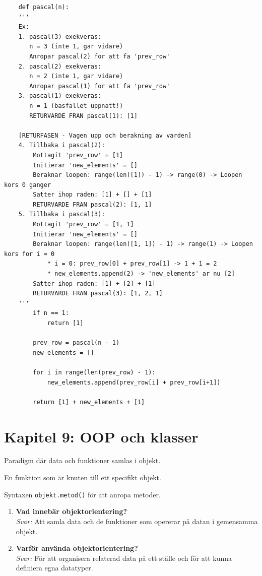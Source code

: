 \documentclass[11pt,a4paper]{article}
\begin{document}
\begin{lstlisting}
    def pascal(n):
    '''
    Ex:
    1. pascal(3) exekveras:
       n = 3 (inte 1, gar vidare)
       Anropar pascal(2) for att fa 'prev_row'
    2. pascal(2) exekveras:
       n = 2 (inte 1, gar vidare)
       Anropar pascal(1) for att fa 'prev_row'
    3. pascal(1) exekveras:
       n = 1 (basfallet uppnatt!)
       RETURVARDE FRAN pascal(1): [1]

    [RETURFASEN - Vagen upp och berakning av varden]
    4. Tillbaka i pascal(2):
        Mottagit 'prev_row' = [1]
        Initierar 'new_elements' = []
        Beraknar loopen: range(len([1]) - 1) -> range(0) -> Loopen kors 0 ganger
        Satter ihop raden: [1] + [] + [1]
        RETURVARDE FRAN pascal(2): [1, 1]
    5. Tillbaka i pascal(3):
        Mottagit 'prev_row' = [1, 1]
        Initierar 'new_elements' = []
        Beraknar loopen: range(len([1, 1]) - 1) -> range(1) -> Loopen kors for i = 0
            * i = 0: prev_row[0] + prev_row[1] -> 1 + 1 = 2
            * new_elements.append(2) -> 'new_elements' ar nu [2]
        Satter ihop raden: [1] + [2] + [1]
        RETURVARDE FRAN pascal(3): [1, 2, 1]
    '''
        if n == 1:
            return [1]
        
        prev_row = pascal(n - 1)
        new_elements = []
        
        for i in range(len(prev_row) - 1):
            new_elements.append(prev_row[i] + prev_row[i+1])
            
        return [1] + new_elements + [1]
\end{lstlisting}

\section{Kapitel 9: OOP och klasser}

\begin{description}[style=nextline, leftmargin=1cm, labelindent=0.5cm]
    \item[\color{primary}Objektorientering] Paradigm där data och funktioner samlas i objekt.
    \item[\color{primary}Metod] En funktion som är knuten till ett specifikt objekt.
    \item[\color{primary}Punktnotation] Syntaxen \texttt{objekt.metod()} för att anropa metoder.
\end{description}

\begin{enumerate}[label=\bfseries\color{primary}Fråga \arabic*:, leftmargin=1.8cm]
    \item \textbf{Vad innebär objektorientering?}
    \\ \textit{Svar:} Att samla data och de funktioner som opererar på datan i gemensamma objekt.
    
    \item \textbf{Varför använda objektorientering?}
    \\ \textit{Svar:} För att organisera relaterad data på ett ställe och för att kunna definiera egna datatyper.
\end{enumerate}
\end{document}
